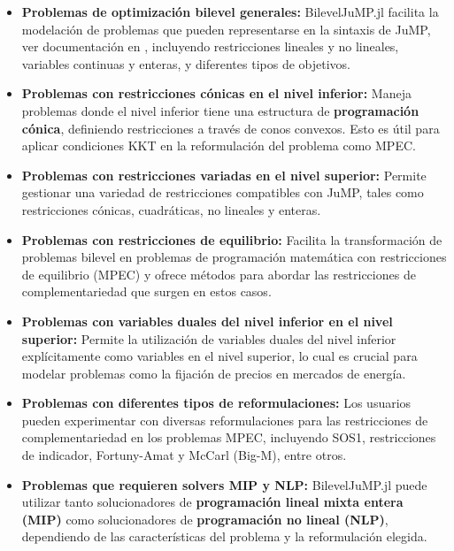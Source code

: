 \begin{itemize}
    \item \textbf{Problemas de optimización bilevel generales:} BilevelJuMP.jl facilita la modelación de problemas que pueden representarse en la sintaxis de JuMP, ver documentación en \cite{JuMPPaper}, incluyendo restricciones lineales y no lineales, variables continuas y enteras, y diferentes tipos de objetivos.
    
    \item \textbf{Problemas con restricciones cónicas en el nivel inferior:} Maneja problemas donde el nivel inferior tiene una estructura de \textbf{programación cónica}, definiendo restricciones a través de conos convexos. Esto es útil para aplicar condiciones KKT en la reformulación del problema como MPEC.
    
    \item \textbf{Problemas con restricciones variadas en el nivel superior:} Permite gestionar una variedad de restricciones compatibles con JuMP, tales como restricciones cónicas, cuadráticas, no lineales y enteras.
    
    \item \textbf{Problemas con restricciones de equilibrio:} Facilita la transformación de problemas bilevel en problemas de programación matemática con restricciones de equilibrio (MPEC) y ofrece métodos para abordar las restricciones de complementariedad que surgen en estos casos.
    
    \item \textbf{Problemas con variables duales del nivel inferior en el nivel superior:} Permite la utilización de variables duales del nivel inferior explícitamente como variables en el nivel superior, lo cual es crucial para modelar problemas como la fijación de precios en mercados de energía.
    
    \item \textbf{Problemas con diferentes tipos de reformulaciones:} Los usuarios pueden experimentar con diversas reformulaciones para las restricciones de complementariedad en los problemas MPEC, incluyendo SOS1, restricciones de indicador, Fortuny-Amat y McCarl (Big-M), entre otros.
    
    \item \textbf{Problemas que requieren solvers MIP y NLP:} BilevelJuMP.jl puede utilizar tanto solucionadores de \textbf{programación lineal mixta entera (MIP)} como solucionadores de \textbf{programación no lineal (NLP)}, dependiendo de las características del problema y la reformulación elegida.
\end{itemize}


